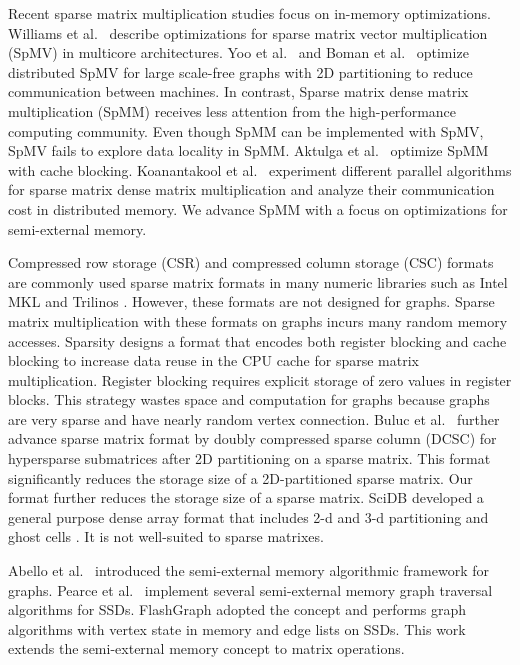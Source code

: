 Recent sparse matrix multiplication studies focus on in-memory optimizations.
Williams et al.~\cite{Williams07} describe optimizations for sparse matrix
vector multiplication (SpMV) in multicore architectures. Yoo et al.~\cite{Yoo11}
and Boman et al.~\cite{Boman2013} optimize distributed SpMV for large
scale-free graphs with 2D partitioning to reduce communication between
machines. In contrast, Sparse matrix dense matrix multiplication (SpMM) receives
less attention from the high-performance computing community. Even though
SpMM can be implemented with SpMV, SpMV fails to explore data locality in
SpMM. Aktulga et al.~\cite{Aktulga14} optimize SpMM with cache blocking.
Koanantakool et al.~\cite{Koanantakool16} experiment different parallel
algorithms for sparse matrix dense matrix multiplication and analyze
their communication cost in distributed memory.
We advance SpMM with a focus on optimizations for semi-external memory.

Compressed row storage (CSR) and compressed column storage (CSC) formats are commonly
used sparse matrix formats in many numeric libraries such as Intel MKL \cite{mkl}
and Trilinos \cite{trilinos}. However, these formats are not designed for graphs.
Sparse matrix multiplication with these formats on graphs incurs many random memory
accesses. %
Sparsity \cite{Im04} designs a format that encodes both register blocking and cache blocking to
increase data reuse in the CPU cache for sparse matrix multiplication. Register blocking
requires explicit storage of zero values in register blocks. This strategy
wastes space and computation for graphs because graphs are very
sparse and have nearly random vertex connection. Buluc et al.~\cite{Buluc08}
further advance sparse matrix format
by doubly compressed sparse column (DCSC) for hypersparse submatrices after 2D
partitioning on a sparse matrix. This format significantly reduces the storage
size of a 2D-partitioned sparse matrix. Our format further reduces the storage
size of a sparse matrix. SciDB \cite{Stonebraker11} developed a general purpose
dense array format that includes 2-d and 3-d partitioning and ghost cells
\cite{Soroush11}.  It is not well-suited to sparse matrixes.


Abello et al.~\cite{Abello98} introduced the semi-external memory algorithmic
framework for graphs. Pearce et al.~\cite{Pearce10} implement several 
semi-external memory graph traversal algorithms for SSDs. FlashGraph
\cite{FlashGraph} adopted the concept and performs graph algorithms with
vertex state in memory and edge lists on SSDs. This work extends the semi-external
memory concept to matrix operations.

